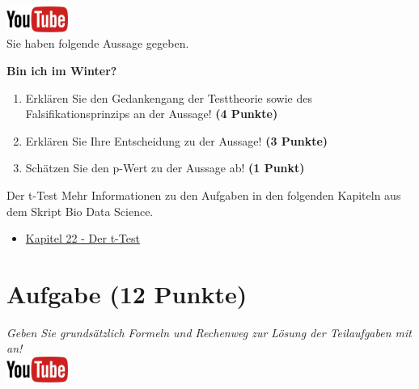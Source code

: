 \documentclass[a4paper, 10pt]{scrartcl}\usepackage[]{graphicx}\usepackage[]{xcolor}
\begin{document}
\hfill\href{https://youtu.be/gQwvMuZ-Sjs}{\includegraphics[width =
  2cm]{img/youtube}}\\[1Ex]



Sie haben folgende Aussage gegeben.

\begin{center}
  \Large\textbf{Bin ich im Winter?}
\end{center}

\begin{enumerate}
\item Erkl{\"a}ren Sie den Gedankengang der Testtheorie sowie des Falsifikationsprinzips an der Aussage! \textbf{(4 Punkte)}
\item Erkl{\"a}ren Sie Ihre Entscheidung zu der Aussage! \textbf{(3 Punkte)}
\item Sch{\"a}tzen Sie den p-Wert zu der Aussage ab! \textbf{(1 Punkt)}
\end{enumerate}

 
\clearpage
\begin{graybox}{Der t-Test}
Mehr Informationen zu den Aufgaben in den folgenden Kapiteln aus dem Skript Bio Data Science.
  \begin{itemize}
  \item \href{https://jkruppa.github.io/stat-tests-ttest.html}{Kapitel 22 - Der t-Test}
  \end{itemize}
\end{graybox}
\clearpage

\section{Aufgabe \hfill (12 Punkte)}

\textit{Geben Sie grunds{\"a}tzlich Formeln und Rechenweg zur L{\"o}sung der
  Teilaufgaben mit an!} \\[1Ex]

\hfill\href{https://youtu.be/Cq_rF_z4xOk}{\includegraphics[width =
  2cm]{img/youtube}}\\[1Ex]
\end{document}
